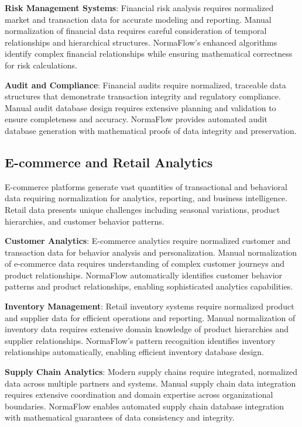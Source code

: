 \documentclass[acmsmall]{acmart}
\newcommand{\parab}[1]{\vspace{0.05in}\noindent\textbf{#1}}
\begin{document}
\parab{Risk Management Systems}: Financial risk analysis requires normalized market and transaction data for accurate modeling and reporting. Manual normalization of financial data requires careful consideration of temporal relationships and hierarchical structures. NormaFlow's enhanced algorithms identify complex financial relationships while ensuring mathematical correctness for risk calculations.

\parab{Audit and Compliance}: Financial audits require normalized, traceable data structures that demonstrate transaction integrity and regulatory compliance. Manual audit database design requires extensive planning and validation to ensure completeness and accuracy. NormaFlow provides automated audit database generation with mathematical proofs of data integrity and preservation.

\subsection{E-commerce and Retail Analytics}

E-commerce platforms generate vast quantities of transactional and behavioral data requiring normalization for analytics, reporting, and business intelligence. Retail data presents unique challenges including seasonal variations, product hierarchies, and customer behavior patterns.

\parab{Customer Analytics}: E-commerce analytics require normalized customer and transaction data for behavior analysis and personalization. Manual normalization of e-commerce data requires understanding of complex customer journeys and product relationships. NormaFlow automatically identifies customer behavior patterns and product relationships, enabling sophisticated analytics capabilities.

\parab{Inventory Management}: Retail inventory systems require normalized product and supplier data for efficient operations and reporting. Manual normalization of inventory data requires extensive domain knowledge of product hierarchies and supplier relationships. NormaFlow's pattern recognition identifies inventory relationships automatically, enabling efficient inventory database design.

\parab{Supply Chain Analytics}: Modern supply chains require integrated, normalized data across multiple partners and systems. Manual supply chain data integration requires extensive coordination and domain expertise across organizational boundaries. NormaFlow enables automated supply chain database integration with mathematical guarantees of data consistency and integrity.
\end{document}
